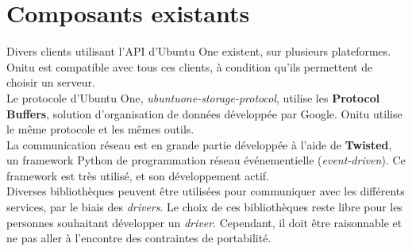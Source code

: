 \section{Composants existants}
\thispagestyle{EIP} %
Divers clients utilisant l'API d'Ubuntu One existent, sur plusieurs plateformes. Onitu est compatible avec tous ces clients, à condition qu'ils permettent de choisir un serveur.\\

Le protocole d'Ubuntu One, \textit{ubuntuone-storage-protocol}, utilise les \textbf{Protocol Buffers}, solution d'organisation de données développée par Google. Onitu utilise le même protocole et les mêmes outils.\\

La communication réseau est en grande partie développée à l'aide de \textbf{Twisted}, un framework Python de programmation réseau événementielle (\emph{event-driven}). Ce framework est très utilisé, et son développement actif.\\

Diverses bibliothèques peuvent être utilisées pour communiquer avec les différents services, par le biais des \textit{drivers}. Le choix de ces bibliothèques reste libre pour les personnes souhaitant développer un \textit{driver}. Cependant, il doit être raisonnable et ne pas aller à l'encontre des contraintes de portabilité.